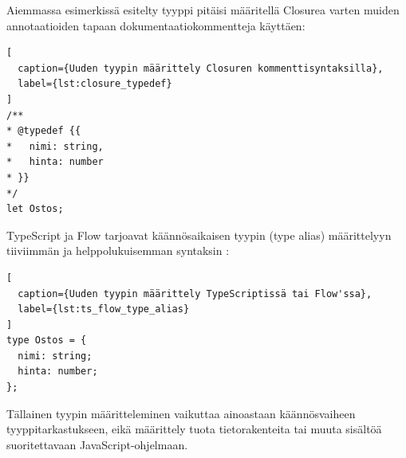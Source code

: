 Aiemmassa esimerkissä esitelty tyyppi  pitäisi
määritellä Closurea varten muiden annotaatioiden tapaan dokumentaatiokommentteja käyttäen:

\begin{lstlisting}[
  caption={Uuden tyypin määrittely Closuren kommenttisyntaksilla},
  label={lst:closure_typedef}
]
/**
* @typedef {{
*   nimi: string,
*   hinta: number
* }}
*/
let Ostos;
\end{lstlisting}
TypeScript ja Flow tarjoavat käännösaikaisen tyypin (type alias)
määrittelyyn tiiviimmän ja helppolukuisemman syntaksin \cite{TypeScriptSpec}:
\begin{lstlisting}[
  caption={Uuden tyypin määrittely TypeScriptissä tai Flow'ssa},
  label={lst:ts_flow_type_alias}
]
type Ostos = {
  nimi: string;
  hinta: number;
};
\end{lstlisting}
Tällainen tyypin määritteleminen vaikuttaa ainoastaan käännösvaiheen
tyyppitarkastukseen, eikä määrittely tuota tietorakenteita tai muuta
sisältöä suoritettavaan JavaScript-ohjelmaan.

